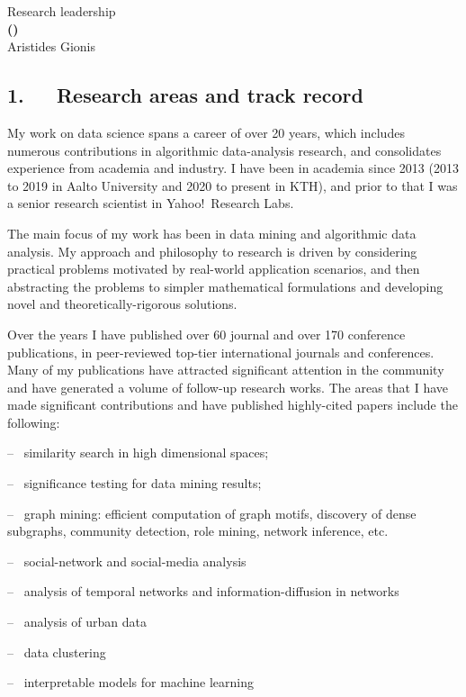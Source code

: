 \documentclass[a4paper,11pt]{article}
\begin{document}
\begin{center} 
{\Large Research leadership} \vspace{3mm}\\
{\Large\bf {\proposaltitle} {\sc (}{\acronymtitle}{\sc )}}  \vspace{3mm} \\
{\Large Aristides Gionis} 
\end{center}


\subsection*{1.~~~Research areas and track record}

My work on data science spans a career of over 20 years, 
which includes numerous contributions in algorithmic data-analysis research, 
and consolidates experience from academia and industry.
I have been in academia since 2013 
(2013 to 2019 in Aalto University and 2020 to present in KTH), 
and prior to that I was a senior research scientist in Yahoo!\ Research Labs. 

The main focus of my work has been in data mining and algorithmic data analysis. 
My approach and philosophy to research is driven by considering practical problems 
motivated by real-world application scenarios, 
and then abstracting the problems to simpler mathematical formulations 
and developing novel and theoretically-rigorous solutions.

Over the years I have published over 60 journal and over 170 conference publications, 
in peer-reviewed top-tier international journals and conferences.
Many of my publications have attracted significant attention in the community
and have generated a volume of follow-up research works.
The areas that I have made significant contributions and 
have published highly-cited papers include the following: 
\squishlist
\item[--~] similarity search in high dimensional spaces; 
\item[--~] significance testing for data mining results; 
\item[--~] graph mining: efficient computation of graph motifs, discovery of dense subgraphs, community detection, role mining, network inference, etc.	
\item[--~] social-network and social-media analysis
\item[--~] analysis of temporal networks and information-diffusion in networks
\item[--~] analysis of urban data
\item[--~] data clustering
\item[--~] interpretable models for machine learning
\squishend
\end{document}
